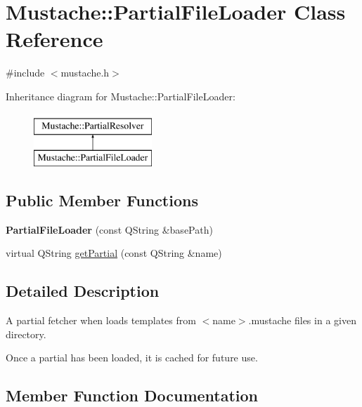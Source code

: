 \hypertarget{classMustache_1_1PartialFileLoader}{}\section{Mustache\+:\+:Partial\+File\+Loader Class Reference}
\label{classMustache_1_1PartialFileLoader}


{\ttfamily \#include $<$mustache.\+h$>$}

Inheritance diagram for Mustache\+:\+:Partial\+File\+Loader\+:\begin{figure}[H]
\begin{center}
\leavevmode
\includegraphics[height=2.000000cm]{da/d31/classMustache_1_1PartialFileLoader}
\end{center}
\end{figure}
\subsection*{Public Member Functions}
\begin{DoxyCompactItemize}
\item 
\hypertarget{classMustache_1_1PartialFileLoader_aa29e049400b033d96c184a72b03306bf}{}{\bfseries Partial\+File\+Loader} (const Q\+String \&base\+Path)\label{classMustache_1_1PartialFileLoader_aa29e049400b033d96c184a72b03306bf}

\item 
virtual Q\+String \hyperlink{classMustache_1_1PartialFileLoader_a36ba8b817708a8755293db46bceb0dbb}{get\+Partial} (const Q\+String \&name)
\end{DoxyCompactItemize}


\subsection{Detailed Description}
A partial fetcher when loads templates from \textquotesingle{}$<$name$>$.mustache\textquotesingle{} files in a given directory.

Once a partial has been loaded, it is cached for future use. 

\subsection{Member Function Documentation}
\hypertarget{classMustache_1_1PartialFileLoader_a36ba8b817708a8755293db46bceb0dbb}{}
